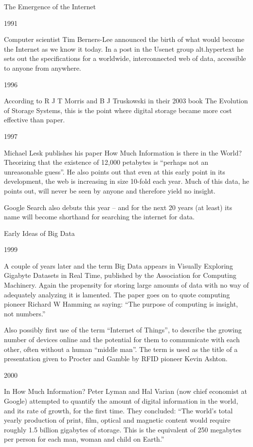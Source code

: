 The Emergence of the Internet

1991

Computer scientist Tim Berners-Lee announced the birth of what would become the Internet as we know it today. In a post in the Usenet group alt.hypertext he sets out the specifications for a worldwide, interconnected web of data, accessible to anyone from anywhere.

1996

According to R J T Morris and B J Truskowski in their 2003 book The Evolution of Storage Systems, this is the point where digital storage became more cost effective than paper.

1997

Michael Lesk publishes his paper How Much Information is there in the World?Theorizing that the existence of 12,000 petabytes is “perhaps not an unreasonable guess”. He also points out that even at this early point in its development, the web is increasing in size 10-fold each year. Much of this data, he points out, will never be seen by anyone and therefore yield no insight.

Google Search also debuts this year – and for the next 20 years (at least) its name will become shorthand for searching the internet for data.

Early Ideas of Big Data

1999

A couple of years later and the term Big Data appears in Visually Exploring Gigabyte Datasets in Real Time, published by the Association for Computing Machinery. Again the propensity for storing large amounts of data with no way of adequately analyzing it is lamented. The paper goes on to quote computing pioneer Richard W Hamming as saying: “The purpose of computing is insight, not numbers.”

Also possibly first use of the term “Internet of Things”, to describe the growing number of devices online and the potential for them to communicate with each other, often without a human “middle man”. The term is used as the title of a presentation given to Procter and Gamble by RFID pioneer Kevin Ashton.

2000

In How Much Information? Peter Lyman and Hal Varian (now chief economist at Google) attempted to quantify the amount of digital information in the world, and its rate of growth, for the first time. They concluded: “The world’s total yearly production of print, film, optical and magnetic content would require roughly 1.5 billion gigabytes of storage. This is the equivalent of 250 megabytes per person for each man, woman and child on Earth.”

